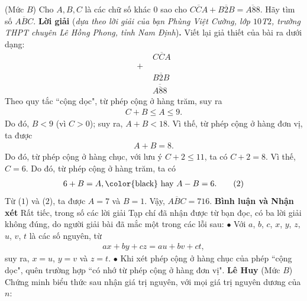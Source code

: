 \begin{multicols}{2}
	\setlength{\abovedisplayskip}{4pt}
	\setlength{\belowdisplayskip}{4pt}
	{}
	(Mức $B$) Cho $A,B,C$ là các chữ số khác $0$ sao cho $\overline{CCA}+\overline{B2B}=\overline{A88}$. Hãy tìm số $\overline{ABC}$.
	\vskip 0.05cm
	\textbf{\color{thachthuctoanhoc}Lời giải} (\textit{dựa theo lời giải của bạn Phùng Việt Cường, lớp $10$T$2$, trường THPT chuyên Lê Hồng Phong, tỉnh Nam Định})\textbf{\color{thachthuctoanhoc}.}
	\vskip 0.05cm
	Viết lại giả thiết của bài ra dưới dạng:
	\begin{align*}
		&\,\,\overline{CCA}\\[-0.6ex]
		+&\\[-1ex]
		&\,\,\overline{B2B}\\[-0.6ex]
		&\overline{\,\,\overline{A88}\,\,}
	\end{align*}
	Theo quy tắc ``cộng dọc", từ phép cộng ở hàng trăm, suy ra
	\begin{align*}
		C + B \le A \le 9.
	\end{align*}
	Do đó, $B < 9$ (vì $C > 0$); suy ra, $A + B < 18$. Vì thế, từ phép cộng ở hàng đơn vị, ta được
	\begin{align*}
		A + B = 8. \tag{$1$}
	\end{align*}                                                                  
	Do đó, từ phép cộng ở hàng chục, với lưu ý $C + 2 \le 11$, ta có $C + 2 = 8$. Vì thế, $C = 6$. Do đó, từ phép cộng ở hàng trăm, ta có
	\begin{align*}
		6 + B = A, \text{\color{black} hay }A - B = 6. \tag{$2$}
	\end{align*}
	Từ ($1$) và ($2$), ta được $A = 7$ và $B = 1$.
	\vskip 0.05cm
	Vậy, $\overline {ABC}  = 716$.
	\vskip 0.05cm
	\textbf{\color{thachthuctoanhoc}Bình luận và Nhận xét}
	\vskip 0.05cm
	Rất tiếc, trong số các lời giải Tạp chí đã nhận được từ bạn đọc, có ba lời giải không đúng, do người giải bài đã mắc một trong các lỗi sau:
	\vskip 0.05cm
	$\bullet$  Với $a$, $b$, $c$, $x$, $y$, $z$, $u$, $v$, $t$ là các số nguyên, từ
	\begin{align*}
		ax + by + cz = au + bv + ct,
	\end{align*}
	suy ra, $x = u$, $y = v$ và $z = t$.
	\vskip 0.05cm
	$\bullet$  Khi xét phép cộng ở hàng chục của phép ``cộng dọc", quên trường hợp ``có nhớ từ phép cộng ở hàng đơn vị".
	\vskip 0.05cm
	\hfill	\textbf{\color{thachthuctoanhoc}Lê Huy}
	\vskip 0.05cm
	{}
	(Mức $B$) Chứng minh biểu thức sau nhận giá trị nguyên, với mọi giá trị nguyên dương của $n$:

\end{multicols}
